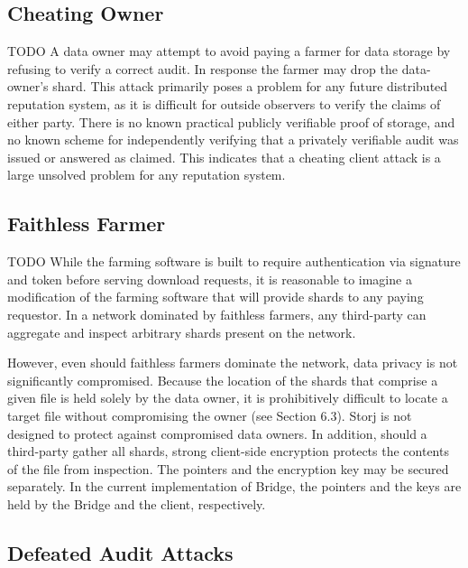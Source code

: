 \documentclass[a4paper,10pt]{article}
\newcommand{\todo}[1]{{\color{red} TODO #1}}
\begin{document}
\subsection{Cheating Owner}

\todo{
A data owner may attempt to avoid paying a farmer for data storage by refusing
to verify a correct audit. In response the farmer may drop the data-owner’s
shard. This attack primarily poses a problem for any future distributed
reputation system, as it is difficult for outside observers to verify the claims
of either party. There is no known practical publicly verifiable proof of
storage, and no known scheme for independently verifying that a privately
verifiable audit was issued or answered as claimed. This indicates that a
cheating client attack is a large unsolved problem for any reputation system.
}

\subsection{Faithless Farmer}

\todo{
While the farming software is built to require authentication via signature and
token before serving download requests, it is reasonable to imagine a
modification of the farming software that will provide shards to any paying
requestor. In a network dominated by faithless farmers, any third-party can
aggregate and inspect arbitrary shards present on the network.

However, even should faithless farmers dominate the network, data privacy is not
significantly compromised. Because the location of the shards that comprise a
given file is held solely by the data owner, it is prohibitively difficult to
locate a target file without compromising the owner (see Section 6.3). Storj is
not designed to protect against compromised data owners. In addition, should a
third-party gather all shards, strong client-side encryption protects the
contents of the file from inspection. The pointers and the encryption key may be
secured separately. In the current implementation of Bridge, the pointers and
the keys are held by the Bridge and the client, respectively.
}

\subsection{Defeated Audit Attacks}
\end{document}
